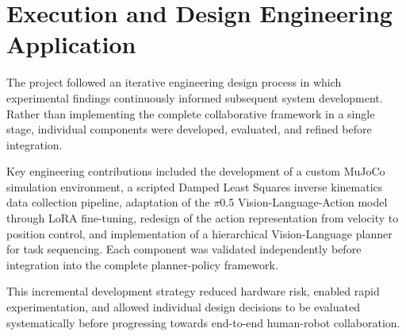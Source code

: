 \documentclass[conference, 12pt]{IEEEtran}
\begin{document}





\section{Execution and Design Engineering Application}

The project followed an iterative engineering design process in which experimental findings continuously informed subsequent system development. Rather than implementing the complete collaborative framework in a single stage, individual components were developed, evaluated, and refined before integration.

Key engineering contributions included the development of a custom MuJoCo simulation environment, a scripted Damped Least Squares inverse kinematics data collection pipeline, adaptation of the $\pi$0.5 Vision-Language-Action model through LoRA fine-tuning, redesign of the action representation from velocity to position control, and implementation of a hierarchical Vision-Language planner for task sequencing. Each component was validated independently before integration into the complete planner-policy framework.

This incremental development strategy reduced hardware risk, enabled rapid experimentation, and allowed individual design decisions to be evaluated systematically before progressing towards end-to-end human-robot collaboration.
\end{document}

